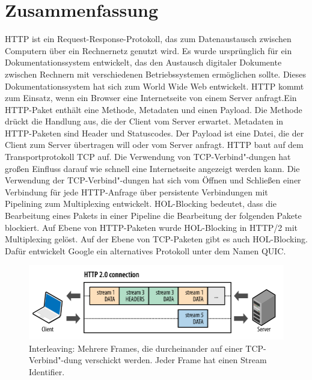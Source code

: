 \documentclass{llncs}
\begin{document}
\section{Zusammenfassung}
HTTP ist ein Request-Response-Protokoll, das zum Datenaustausch zwischen Computern über ein Rechnernetz genutzt wird. Es wurde ursprünglich für ein Dokumentationssystem entwickelt, das den Austausch digitaler Dokumente zwischen Rechnern mit verschiedenen Betriebssystemen ermöglichen sollte. Dieses Dokumentationssystem hat sich zum World Wide Web entwickelt. 
HTTP kommt zum Einsatz, wenn ein Browser eine Internetseite von einem Server anfragt.\newline Ein HTTP-Paket enthält eine Methode, Metadaten und einen Payload. Die Methode drückt die Handlung aus, die der Client vom Server erwartet. Metadaten in HTTP-Paketen sind Header und Statuscodes. Der Payload ist eine Datei, die der Client zum Server übertragen will oder vom Server anfragt. \newline
HTTP baut auf dem Transportprotokoll TCP auf.
Die Verwendung von TCP-Verbind"-dungen hat großen Einfluss darauf wie schnell eine Internetseite angezeigt werden kann. Die Verwendung der TCP-Verbind"-dungen hat sich vom Öffnen und Schließen einer Verbindung für jede HTTP-Anfrage über persistente Verbindungen mit Pipelining zum Multiplexing entwickelt. \newline
HOL-Blocking bedeutet, dass die Bearbeitung eines Pakets in einer Pipeline die Bearbeitung der folgenden Pakete blockiert. Auf Ebene von HTTP-Paketen wurde HOL-Blocking in HTTP/2 mit Multiplexing gelöst.
 Auf der Ebene von TCP-Paketen gibt es auch HOL-Blocking. Dafür entwickelt Google ein alternatives Protokoll unter dem Namen QUIC.
 \begin{figure}[!ht]
\includegraphics[width=\columnwidth]{Multiplexing.png}
\caption{Interleaving: Mehrere Frames, die durcheinander auf einer TCP-Verbind"-dung verschickt werden. Jeder Frame hat einen Stream Identifier. 
\cite{Interleaving}
}
\label{Multiplexing}
\end{figure}

\renewcommand\refname{Bilder und Literatur}


\end{document}

